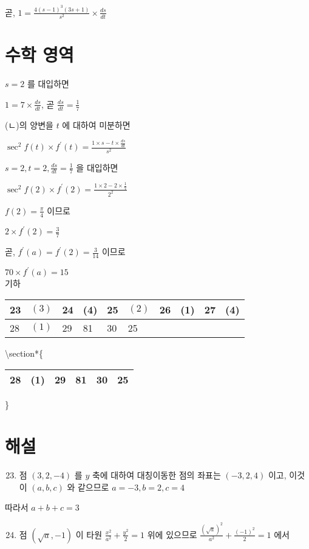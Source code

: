 \documentclass[10pt]{article}
\begin{document}
곧, $1=\frac{4(s-1)^{3}(3 s+1)}{s^{2}} \times \frac{d s}{d t}$

\section*{수학 영역}
$s=2$ 를 대입하면

$1=7 \times \frac{d s}{d t}$, 곧 $\frac{d s}{d t}=\frac{1}{7}$

(ㄴ)의 양변을 $t$ 에 대하여 미분하면

$\sec ^{2} f(t) \times f^{\prime}(t)=\frac{1 \times s-t \times \frac{d s}{d t}}{s^{2}}$

$s=2, t=2, \frac{d s}{d t}=\frac{1}{7}$ 을 대입하면

$\sec ^{2} f(2) \times f^{\prime}(2)=\frac{1 \times 2-2 \times \frac{1}{7}}{2^{2}}$

$f(2)=\frac{\pi}{4}$ 이므로

$2 \times f^{\prime}(2)=\frac{3}{7}$

곧, $f^{\prime}(a)=f^{\prime}(2)=\frac{3}{14}$ 이므로

$70 \times f^{\prime}(a)=15$\\
기하

\begin{center}
\begin{tabular}{|l|l|l|l|l|l|l|l|l|l|}
\hline
23 & $(3)$ & 24 & (4) & 25 & $(2)$ & 26 & (1) & 27 & (4) \\
\hline
28 & $(1)$ & 29 & 81 & 30 & 25 &  &  &  &  \\
\hline
\end{tabular}
\end{center}

\textbackslash section*\{\begin{tabular}{llllll}
28 & (1) & 29 & 81 & 30 & 25 \\
\hline
\end{tabular}\}

\section*{해설}
\begin{enumerate}
  \setcounter{enumi}{22}
  \item 점 $(3,2,-4)$ 를 $y$ 축에 대하여 대칭이동한 점의 좌표는 $(-3,2,4)$ 이고, 이것이 $(a, b, c)$ 와 같으므로 $a=-3, b=2, c=4$
\end{enumerate}

따라서 $a+b+c=3$

\begin{enumerate}
  \setcounter{enumi}{23}
  \item 점 $(\sqrt{a},-1)$ 이 타원 $\frac{x^{2}}{a^{2}}+\frac{y^{2}}{2}=1$ 위에 있으므로 $\frac{(\sqrt{a})^{2}}{a^{2}}+\frac{(-1)^{2}}{2}=1$ 에서
\end{enumerate}
\end{document}
